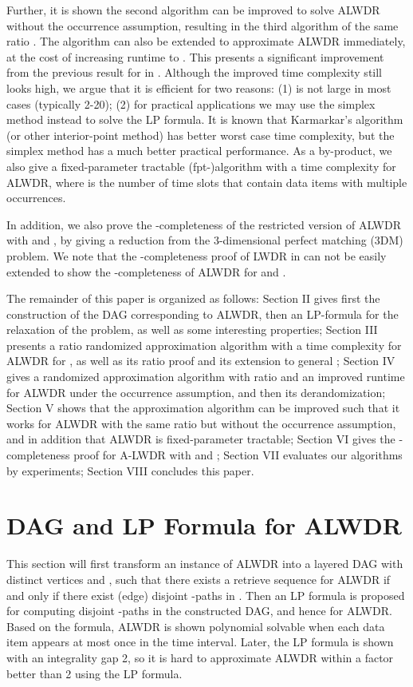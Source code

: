 \documentclass[11pt,english,onecolumn,draftcls]{IEEEtran}
\theoremstyle{plain}
\theoremstyle{plain}
\theoremstyle{plain}
\theoremstyle{plain}
\begin{document}
Further, it is shown the second algorithm can be improved to solve
ALWDR without the occurrence assumption, resulting
in the third algorithm of the same ratio . The algorithm
can also be extended to approximate ALWDR immediately, at
the cost of increasing runtime to .
This presents a significant improvement from the previous result 
for  in \cite{lu2014data}. Although the improved time
complexity still looks high, we argue that it is efficient for two
reasons: (1)  is not large in most cases (typically 2-20); (2)
for practical applications we may use the simplex method instead to
solve the LP formula. It is known that Karmarkar's algorithm (or other
interior-point method) has better worst case time complexity, but
the simplex method has a much better practical performance. As a by-product,
we also give a fixed-parameter tractable (fpt-)algorithm with a time
complexity  for ALWDR, where 
is the number of time slots that contain data items with multiple
occurrences.

In addition, we also prove the -completeness of the restricted
version of ALWDR with  and ,
by giving a reduction from the 3-dimensional perfect matching (3DM)
problem. We note that the -completeness proof of LWDR
in \cite{Infocom12LuEfficient} can not be easily extended to show
the -completeness of ALWDR for 
and .

The remainder of this paper is organized as follows: Section II gives
first the construction of the DAG corresponding to ALWDR,
then an LP-formula for the relaxation of the problem, as well as some
interesting properties; Section III presents a ratio 
randomized approximation algorithm with a time complexity 
for ALWDR for , as well as its ratio
proof and its extension to general ; Section IV gives a randomized
approximation algorithm with ratio  and an improved
runtime  for ALWDR under the
occurrence assumption, and then its derandomization; Section V shows
that the approximation algorithm can be improved such that it works
for ALWDR with the same ratio  but
without the occurrence assumption, and in addition that ALWDR
is fixed-parameter tractable; Section VI gives the -completeness
proof for A-LWDR with  and ;
Section VII evaluates our algorithms by experiments; Section VIII
concludes this paper.


\section{DAG and LP Formula for ALWDR}

This section will first transform an instance of ALWDR into
a layered DAG  with distinct vertices  and , such that
there exists a retrieve sequence for ALWDR if and only if
there exist  (edge) disjoint -paths in . Then an
LP formula is proposed for computing  disjoint -paths
in the constructed DAG, and hence for ALWDR. Based on the
formula, ALWDR is shown polynomial solvable when each data
item appears at most once in the time interval. Later, the LP formula
is shown with an integrality gap 2, so it is hard to approximate ALWDR
within a factor better than 2 using the LP formula.
\end{document}
